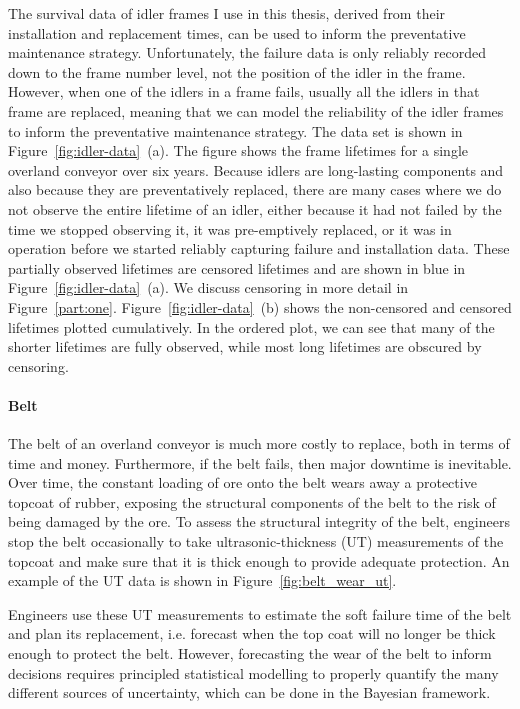 The survival data of idler frames I use in this thesis, derived from their installation and replacement times, can be used to inform the preventative maintenance strategy. Unfortunately, the failure data is only reliably recorded down to the frame number level, not the position of the idler in the frame. However, when one of the idlers in a frame fails, usually all the idlers in that frame are replaced, meaning that we can model the reliability of the idler frames to inform the preventative maintenance strategy. The data set is shown in Figure~\ref{fig:idler-data}~(a). The figure shows the frame lifetimes for a single overland conveyor over six years. Because idlers are long-lasting components and also because they are preventatively replaced, there are many cases where we do not observe the entire lifetime of an idler, either because it had not failed by the time we stopped observing it, it was pre-emptively replaced, or it was in operation before we started reliably capturing failure and installation data. These partially observed lifetimes are censored lifetimes and are shown in blue in Figure~\ref{fig:idler-data}~(a). We discuss censoring in more detail in Figure~\ref{part:one}. Figure~\ref{fig:idler-data}~(b) shows the non-censored and censored lifetimes plotted cumulatively. In the ordered plot, we can see that many of the shorter lifetimes are fully observed, while most long lifetimes are obscured by censoring.

\paragraph*{Belt}

The belt of an overland conveyor is much more costly to replace, both in terms of time and money. Furthermore, if the belt fails, then major downtime is inevitable. Over time, the constant loading of ore onto the belt wears away a protective topcoat of rubber, exposing the structural components of the belt to the risk of being damaged by the ore. To assess the structural integrity of the belt, engineers stop the belt occasionally to take ultrasonic-thickness (UT) measurements of the topcoat and make sure that it is thick enough to provide adequate protection. An example of the UT data is shown in Figure~\ref{fig:belt_wear_ut}.

Engineers use these UT measurements to estimate the soft failure time of the belt and plan its replacement, i.e. forecast when the top coat will no longer be thick enough to protect the belt. However, forecasting the wear of the belt to inform decisions requires principled statistical modelling to properly quantify the many different sources of uncertainty, which can be done in the Bayesian framework.

